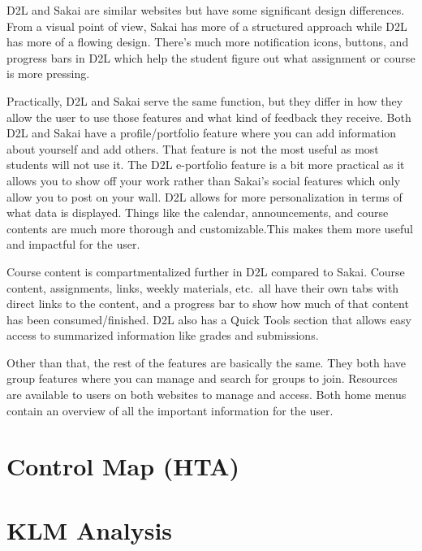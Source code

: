 \documentclass[12pt]{article}
\begin{document}
    D2L and Sakai are similar websites but have some significant design differences.
    From a visual point of view, Sakai has more of a structured approach while D2L has more of a flowing design.
    There’s much more notification icons, buttons, and progress bars in D2L which help the student figure out what assignment or course is more pressing.

    Practically, D2L and Sakai serve the same function, but they differ in how they allow the user to use those features and what kind of feedback they receive.
    Both D2L and Sakai have a profile/portfolio feature where you can add information about yourself and add others.
    That feature is not the most useful as most students will not use it.
    The D2L e-portfolio feature is a bit more practical as it allows you to show off your work rather than Sakai’s social features which only allow you to post on your wall.
    D2L allows for more personalization in terms of what data is displayed.
    Things like the calendar, announcements, and course contents are much more thorough and customizable.This makes them more useful and impactful for the user.

    Course content is compartmentalized further in D2L compared to Sakai.
    Course content, assignments, links, weekly materials, etc.\ all have their own tabs with direct links to the content, and a progress bar to show how much of that content has been consumed/finished.
    D2L also has a Quick Tools section that allows easy access to summarized information like grades and submissions.

    Other than that, the rest of the features are basically the same.
    They both have group features where you can manage and search for groups to join.
    Resources are available to users on both websites to manage and access.
    Both home menus contain an overview of all the important information for the user.


    \section{Control Map (HTA)}\label{sec:control-maphta}



    \section{KLM Analysis}\label{sec:klm-analysis}

\end{document}
